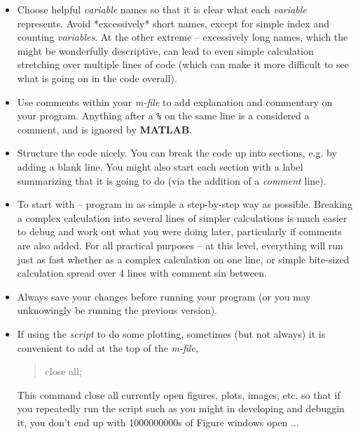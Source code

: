 \documentclass{tufte-book} %
\newenvironment{docspec}{\begin{quotation}\ttfamily\parskip0pt\parindent0pt\ignorespaces}{\end{quotation}}
\begin{document}
\begin{itemize}[noitemsep]
\setlength{\itemindent}{.2in}

\item Choose helpful \textit{variable} names so that it is clear what each \textit{variable} represents. Avoid *excessively* short names, except for simple index and counting \textit{variables}. At the other extreme -- excessively long names, which the might be wonderfully descriptive, can lead to even simple calculation stretching over multiple lines of code (which can make it more difficult to see what is going on in the code overall).

\item Use comments within your \textit{m-file} to add explanation and commentary on your program. Anything after a \texttt{\%} on the same line is a considered a comment, and is ignored by \textbf{MATLAB}.

\item Structure the code nicely. You can break the code up into sections, e.g. by adding a blank line. You might also start each section with a label summarizing that it is going to do (via the addition of a \textit{comment} line).

\item To start with -- program in as simple a step-by-step way as possible. Breaking a complex calculation into several lines of simpler calculations is much easier to debug and work out what you were doing later, particularly if comments are also added. For all practical purposes -- at this level, everything will run just as fast whether as a complex calculation on one line, or simple bite-sized calculation spread over 4 lines with comment sin between. 

\item Always save your changes before running your program (or you may unknowingly be running the previous version).

\item If using the \textit{script} to do some plotting, sometimes (but not always) it is convenient to add at the top of the \textit{m-file}, \begin{docspec}
close all;
\end{docspec}
This command close all currently open figures, plots, images, etc. so that if you repeatedly run the script such as you might in developing and debuggin it, you don't end up with 1000000000s of \textsf{Figure windows} open ...

\end{itemize}
\end{document}
